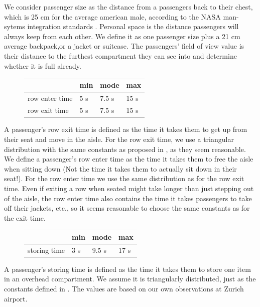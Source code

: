 \documentclass[11pt]{article}
\begin{document}
	We consider passenger size as the distance from a passengers back to their chest, which is 25 cm for the average american male, according to the NASA man-sytems integration standards \cite{nasa}. Personal space is the distance passengers will always keep from each other. We define it as one passenger size plus a 21 cm average backpack,or a jacket or suitcase.
	The passengers' field of view value is their distance to the furthest compartment they can see into and determine whether it is full already.

\begin{figure}[h!]
\begin{tabular}{l|l l l}

	&min &mode&max \\
	\hline
row enter time & 5 s &7.5 s & 15 s \\
	\hline
	row exit time& 5 s &7.5 s & 15 s \\
	\hline
\end{tabular}
\end{figure}

A passenger's row exit time is defined as the time it takes them to get up from their seat and move in the aisle. For the row exit time, we use a triangular distribution with the same constants as proposed in \cite{beus}, as they seem reasonable. We define a passenger's row enter time as the time it takes them to free the aisle when sitting down (Not the time it takes them to actually sit down in their seat!). For the row enter time we use the same distribution as for the row exit time. Even if exiting a row when seated might take longer than just stepping out of the aisle, the row enter time also contains the time it takes passengers to take off their jackets, etc., so it seems reasonable to choose the same constants as for the exit time.

\begin{figure}[h!]
\begin{tabular}{l|l l l}

	&min &mode&max \\
	\hline
storing time & 3 s &9.5 s & 17 s \\
	\hline

	\end{tabular}
\end{figure}

A passenger's storing time is defined as the time it takes them to store one item in an overhead compartment. We assume it is triangularly distributed, just as the constants defined in \cite{beus}. The values are based on our own observations at Zurich airport.
\end{document}
